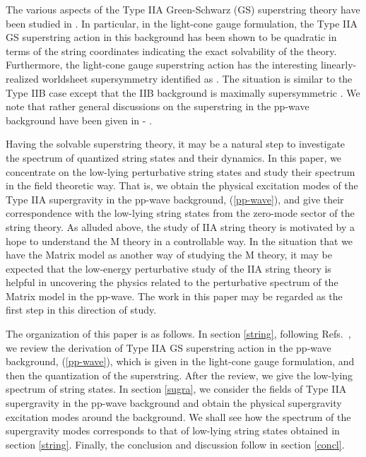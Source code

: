 \documentclass[a4paper,12pt]{article}
\numberwithin{equation}{section}
\begin{document}
The various aspects of the Type IIA Green-Schwarz (GS) superstring
theory have been studied in \cite{hyu074,sug029,hyu158,hyu343}.  In
particular, in the light-cone gauge formulation, the Type IIA GS
superstring action in this background has been shown to be quadratic
in terms of the string coordinates indicating the exact solvability of
the theory.  Furthermore, the light-cone gauge superstring action has
the interesting linearly-realized worldsheet supersymmetry identified
as \coordHE{} \cite{hyu074}.  The situation is similar to the
Type IIB case except that the IIB background is maximally
supersymmetric \cite{met044,met109}.  We note that rather general
discussions on the superstring in the pp-wave background have been
given in \cite{ali037}-\cite{rus179} .

Having the solvable superstring theory, it may be a natural step to
investigate the spectrum of quantized string states and their
dynamics.  In this paper, we concentrate on the low-lying perturbative
string states and study their spectrum in the field theoretic way.
That is, we obtain the physical excitation modes of the Type IIA
supergravity in the pp-wave background, (\ref{pp-wave}), and give
their correspondence with the low-lying string states from the
zero-mode sector of the string theory.  As alluded above, the study of
IIA string theory is motivated by a hope to understand the M theory in
a controllable way.  In the situation that we have the Matrix model as
another way of studying the M theory, it may be expected that the
low-energy perturbative study of the IIA string theory is helpful in
uncovering the physics related to the perturbative spectrum of the
Matrix model in the pp-wave.  The work in this paper may be regarded
as the first step in this direction of study.

The organization of this paper is as follows.  In section
\ref{string}, following Refs.~\cite{hyu074,hyu158}, we review the
derivation of Type IIA GS superstring action in the pp-wave
background, (\ref{pp-wave}), which is given in the light-cone gauge
formulation, and then the quantization of the superstring.  After the
review, we give the low-lying spectrum of string states.  In section
\ref{sugra}, we consider the fields of Type IIA supergravity in the
pp-wave background and obtain the physical supergravity excitation
modes around the background.  We shall see how the spectrum of the
supergravity modes corresponds to that of low-lying string states
obtained in section \ref{string}.  Finally, the conclusion and
discussion follow in section \ref{concl}.
\end{document}
